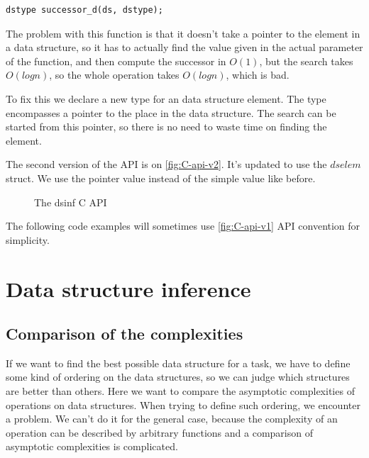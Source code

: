 \documentclass[a4paper,11pt]{article}
\begin{document}
        \begin{lstlisting}
dstype successor_d(ds, dstype);
        \end{lstlisting}

        The problem with this function is that it doesn't take a pointer to the element in a data structure, so it has
        to actually find the value given in the actual parameter of the function, and then compute the successor in
        $O(1)$, but the search takes $O(log n)$, so the whole operation takes $O(log n)$, which is bad.

        To fix this we declare a new type for an data structure element. The type encompasses a pointer to the place in
        the data structure. The search can be started from this pointer, so there is no need to waste time on finding the element.

        The second version of the API is on \autoref{fig:C-api-v2}. It's updated to use the $dselem$ struct. We use the pointer value instead of the simple value like before.

        \begin{figure}[h!]
            
            \caption{The dsinf C API}

            \label{fig:C-api-v2}
        \end{figure}

        The following code examples will sometimes use \autoref{fig:C-api-v1} API convention for simplicity.

\section{Data structure inference}

	\subsection{Comparison of the complexities}

		If we want to find the best possible data structure for a task, we have to define some kind of ordering
		on the data structures, so we can judge which structures are better than others. Here we want to compare the
		asymptotic complexities of operations on data structures. When trying to define such ordering, we
		encounter a problem.  We can't do it for the general case, because the complexity of an operation
        can be described by arbitrary functions and a comparison of asymptotic complexities is complicated.
\end{document}
